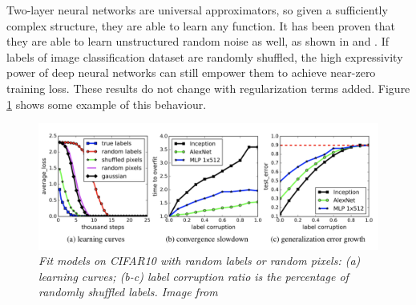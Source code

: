 \documentclass[11pt,a4paper]{article}
\begin{document}
Two-layer neural networks are universal approximators, so given a sufficiently complex structure, they are able to learn any function. 
It has been proven that they are able to learn unstructured random noise as well, as shown in \cite{rethink} and \cite{Mit-overfit}. 
If labels of image classification dataset are randomly shuffled, the high expressivity power of deep neural networks can still empower them to achieve near-zero training loss. 
These results do not change with regularization terms added. 
Figure \ref{random-labels} shows some example of this behaviour.

\begin{figure}[H]
 \centering
 \includegraphics[scale=0.4]{../images/fit-random-labels-zhang.png}
 \caption{\textit{Fit models on CIFAR10 with random labels or random pixels: (a) learning curves; (b-c) label corruption ratio is the percentage of randomly shuffled labels. Image from \cite{rethink}}}  
 \label{random-labels}
\end{figure}

\newpage
\nocite{*}


\end{document}
